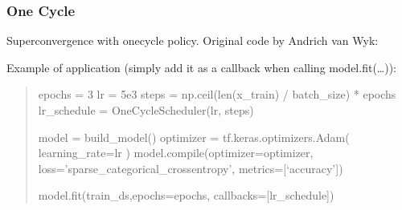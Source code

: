 \documentclass[letterpaper,10pt,english]{sphinxmanual}
\begin{document}
\subsubsection{One Cycle}
\label{\detokenize{engine/schedulers/one_cycle:module-engine.schedulers.one_cycle}}\label{\detokenize{engine/schedulers/one_cycle:one-cycle}}\label{\detokenize{engine/schedulers/one_cycle::doc}}
Super\sphinxhyphen{}convergence with one\sphinxhyphen{}cycle policy.
Original code by Andrich van Wyk: 

Example of application (simply add it as a callback when calling model.fit(…)):
\begin{quote}

epochs = 3
lr = 5e\sphinxhyphen{}3
steps = np.ceil(len(x\_train) / batch\_size) * epochs
lr\_schedule = OneCycleScheduler(lr, steps)

model = build\_model()
optimizer = tf.keras.optimizers.Adam( learning\_rate=lr )
model.compile(optimizer=optimizer, loss=’sparse\_categorical\_crossentropy’, metrics={[}‘accuracy’{]})

model.fit(train\_ds,epochs=epochs, callbacks={[}lr\_schedule{]})
\end{quote}
\end{document}
